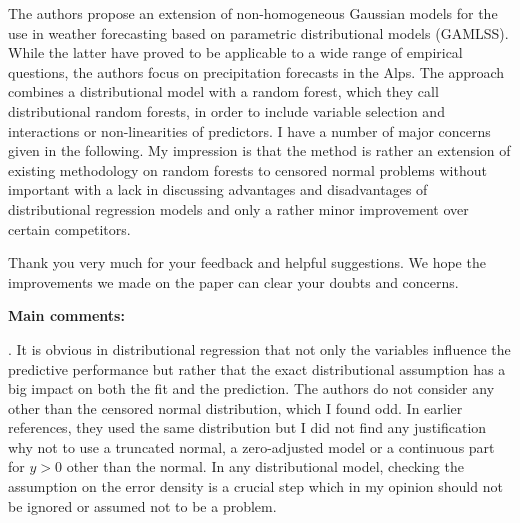 \documentclass[american,foldmarks=false,noconfig]{uibklttr}
\newenvironment{review}{\fontshape{\itdefault}\fontseries{\bfdefault} \selectfont \smallskip}{\par}
\begin{document}
\begin{review}
The authors propose an extension of non-homogeneous Gaussian models 
for the use in weather forecasting based on parametric distributional 
models (GAMLSS). While the latter have proved to be applicable to a 
wide range of empirical questions, the authors focus on precipitation 
forecasts in the Alps. The approach combines a distributional model 
with a random forest, which they call distributional random forests, 
in order to include variable selection and interactions or 
non-linearities of predictors. I have a number of major concerns 
given in the following. My impression is that the method is rather
an extension of existing methodology on random forests to censored 
normal problems without important with a lack in discussing 
advantages and disadvantages of distributional regression models 
and only a rather minor improvement over certain competitors.
\end{review}

Thank you very much for your feedback and helpful suggestions. We hope 
the improvements we made on the paper can clear your doubts and concerns.

\bigskip

\textbf{Main comments:}

\begin{review}
1. It is obvious in distributional regression that not only the 
variables influence the predictive performance but rather that 
the exact distributional assumption has a big impact on both the 
fit and the prediction. The authors do not consider any other
than the censored normal distribution, which I found odd. 
In earlier references, they used the same distribution but I 
did not find any justification why not to use a truncated normal, 
a zero-adjusted model or a continuous part for $y > 0$ other
than the normal. In any distributional model, checking the 
assumption on the error density is a crucial step which in 
my opinion should not be ignored or assumed not to be a problem.
\end{review}
\end{document}
